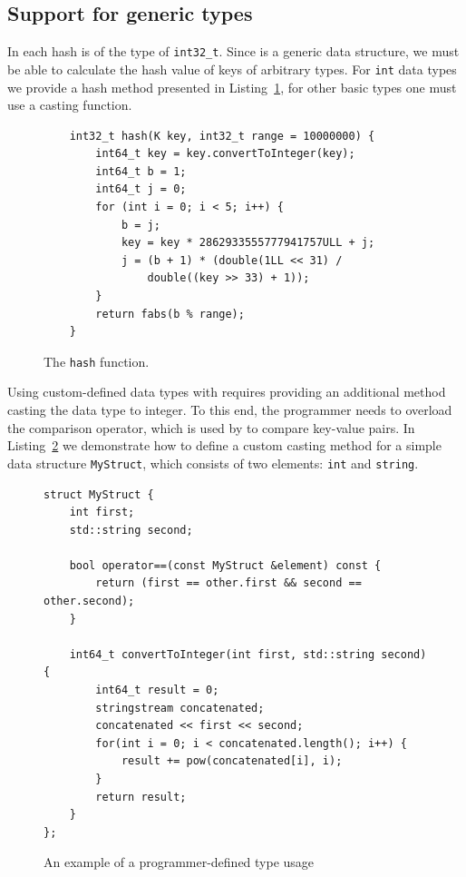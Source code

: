 \subsection{Support for generic types} 

    In \NvmHashMap each hash is of the type of \texttt{int32\_t}. 
    Since \NvmHashMap is a generic data structure, we must be able to calculate the hash value of keys of arbitrary types.
    For \texttt{int} data types we provide a hash method \cite{Hashing} presented in Listing~\ref{Hash}, for other basic types one must use a casting function. 
    
    \begin{figure}[ht]
\renewcommand{\figurename}{Listing}
\begin{lstlisting}
    int32_t hash(K key, int32_t range = 10000000) {
        int64_t key = key.convertToInteger(key);
        int64_t b = 1;
        int64_t j = 0;
        for (int i = 0; i < 5; i++) {
            b = j;
            key = key * 2862933555777941757ULL + j;
            j = (b + 1) * (double(1LL << 31) / 
                double((key >> 33) + 1));
        }
        return fabs(b % range);
    }
\end{lstlisting}
\caption{The \texttt{hash} function.}
\label{Hash}
\end{figure}

    Using custom-defined data types with \NvmHashMap requires providing an additional method casting the data type to integer.
    To this end, the programmer needs to overload the comparison operator, which is used by \NvmHashMap to compare key-value pairs. 
    In Listing~\ref{StdHashOverload} we demonstrate how to define a custom casting method for a simple data structure \texttt{MyStruct}, which consists of two elements: \texttt{int} and \texttt{string}. 
    
    
\begin{figure}[ht]
\renewcommand{\figurename}{Listing}
\begin{lstlisting}
struct MyStruct {
    int first;
    std::string second;
    
    bool operator==(const MyStruct &element) const {
        return (first == other.first && second == other.second);
    }
    
    int64_t convertToInteger(int first, std::string second) {
        int64_t result = 0;
        stringstream concatenated;
        concatenated << first << second;
        for(int i = 0; i < concatenated.length(); i++) {
            result += pow(concatenated[i], i);
        }
        return result;
    }
};
\end{lstlisting}
\caption{An example of a programmer-defined type usage}
\label{StdHashOverload}
\end{figure}

